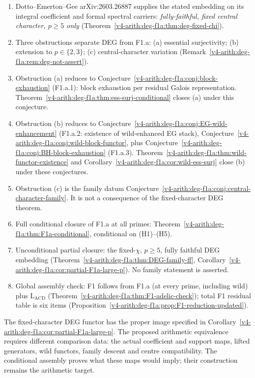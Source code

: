 \begin{enumerate}
\item Dotto--Emerton--Gee arXiv:2603.26887 supplies the stated
embedding on its integral coefficient and formal spectral carriers:
\emph{fully-faithful, fixed central character, \(p\geq 5\) only}
(Theorem~\ref{v4-arith:deg-f1a:thm:deg-fixed-chi}).
\item Three obstructions separate DEG from F1.a:
(a) essential surjectivity; (b) extension to \(p\in\{2,3\}\);
(c) central-character variation
(Remark~\ref{v4-arith:deg-f1a:rem:deg-not-assert}).
\item Obstruction (a) reduces to
Conjecture~\ref{v4-arith:deg-f1a:conj:block-exhaustion} (F1.a.1): block
exhaustion per residual Galois representation.
Theorem~\ref{v4-arith:deg-f1a:thm:ess-surj-conditional} closes (a) under
this conjecture.
\item Obstruction (b) reduces to
Conjecture~\ref{v4-arith:deg-f1a:conj:EG-wild-enhancement} (F1.a.2: existence
of wild-enhanced EG stack),
Conjecture~\ref{v4-arith:deg-f1a:conj:wild-block-functor}, plus
Conjecture~\ref{v4-arith:deg-f1a:conj:BH-block-exhaustion} (F1.a.3).
Theorem~\ref{v4-arith:deg-f1a:thm:wild-functor-existence} and
Corollary~\ref{v4-arith:deg-f1a:cor:wild-ess-surj} close (b) under these
conjectures.
\item Obstruction (c) is the family datum
Conjecture~\ref{v4-arith:deg-f1a:conj:central-character-family}.  It is not a
consequence of the fixed-character DEG theorem.
\item Full conditional closure of F1.a at all primes:
Theorem~\ref{v4-arith:deg-f1a:thm:F1a-conditional}, conditional on
(H1)--(H5).
\item Unconditional partial closure: the fixed-\(\chi\), \(p\geq 5\),
fully faithful DEG embedding
(Theorem~\ref{v4-arith:deg-f1a:thm:DEG-family-ff},
Corollary~\ref{v4-arith:deg-f1a:cor:partial-F1a-large-p}). No family
statement is asserted.
\item Global assembly check: F1 follows from F1.a (at every prime,
including wild) plus \(\mathrm{L}_{\mathrm{ACD}}\)
(Theorem~\ref{v4-arith:deg-f1a:thm:F1-adelic-check}); total F1 residual
table is six items
(Proposition~\ref{v4-arith:deg-f1a:prop:F1-reduction-updated}).
\end{enumerate}

The fixed-character DEG functor has the proper image specified in
Corollary~\ref{v4-arith:deg-f1a:cor:partial-F1a-large-p}. The proposed
arithmetic equivalence requires different comparison data: the actual
coefficient and support maps, lifted generators, wild functors, family
descent and centre compatibility. The conditional assembly proves what
these maps would imply; their construction remains the arithmetic target.

